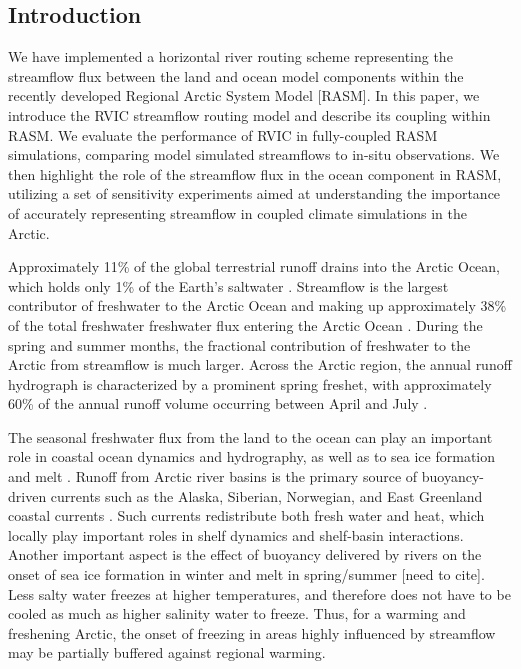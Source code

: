 \documentclass[jgrga, draft]{agutex}
\begin{document}
%

\begin{article}

%
%

\section{Introduction}

We have implemented a horizontal river routing scheme representing the streamflow flux between the land and ocean model components within the recently developed Regional Arctic System Model [RASM].
In this paper, we introduce the RVIC streamflow routing model and describe its coupling within RASM.
We evaluate the performance of RVIC in fully-coupled RASM simulations, comparing model simulated streamflows to in-situ observations.
We then highlight the role of the streamflow flux in the ocean component in RASM, utilizing a set of sensitivity experiments aimed at understanding the importance of accurately representing streamflow in coupled climate simulations in the Arctic.

Approximately 11\% of the global terrestrial runoff drains into the Arctic Ocean, which holds only 1\% of the Earth's saltwater \citep{Lewis_2000,Lammers_2001}.
Streamflow is the largest contributor of freshwater to the Arctic Ocean and making up approximately 38\% of the total freshwater freshwater flux entering the Arctic Ocean \citep{Serreze_2006}.
During the spring and summer months, the fractional contribution of freshwater to the Arctic from streamflow is much larger.
Across the Arctic region, the annual runoff hydrograph is characterized by a prominent spring freshet, with approximately 60\% of the annual runoff volume occurring between April and July \citep{Lammers_2001}.

The seasonal freshwater flux from the land to the ocean can play an important role in coastal ocean dynamics and hydrography, as well as to sea ice formation and melt \citep{Rabe_2011,Fichot_2013}.
Runoff from Arctic river basins is the primary source of buoyancy-driven currents such as the Alaska, Siberian, Norwegian, and East Greenland coastal currents \citep[e.g.][]{Morison_2000,Boyd_2002,McGeehan_2012}.
Such currents redistribute both fresh water and heat, which locally play important roles in shelf dynamics and shelf-basin interactions.
Another important aspect is the effect of buoyancy delivered by rivers on the onset of sea ice formation in winter and melt in spring/summer [need to cite].
Less salty water freezes at higher temperatures, and therefore does not have to be cooled as much as higher salinity water to freeze.
Thus, for a warming and freshening Arctic, the onset of freezing in areas highly influenced by streamflow may be partially buffered against regional warming.


\end{article}
\end{document}
